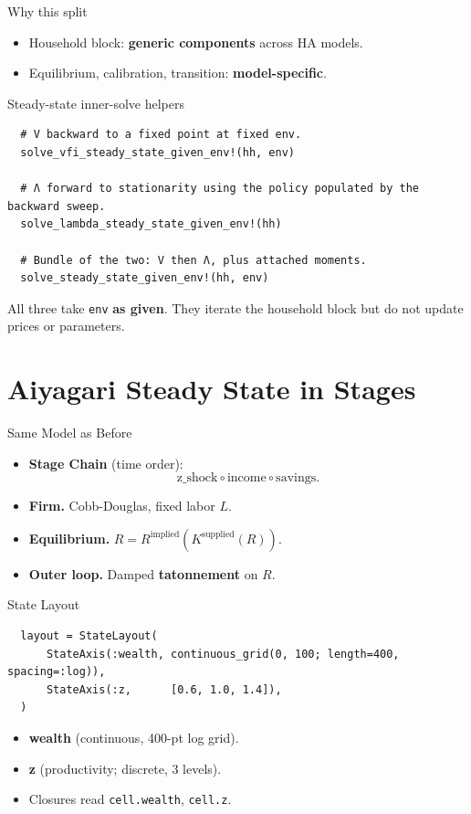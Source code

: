 \documentclass[10pt,aspectratio=169]{beamer}
\begin{document}
\begin{frame}{Why this split}
  \begin{itemize}
    \item Household block: \textbf{generic components} across HA models.
    \item Equilibrium, calibration, transition: \textbf{model-specific}.
  \end{itemize}
\end{frame}

\begin{frame}[fragile]{Steady-state inner-solve helpers}
  \begin{lstlisting}
  # V backward to a fixed point at fixed env.
  solve_vfi_steady_state_given_env!(hh, env)

  # Λ forward to stationarity using the policy populated by the backward sweep.
  solve_lambda_steady_state_given_env!(hh)

  # Bundle of the two: V then Λ, plus attached moments.
  solve_steady_state_given_env!(hh, env)
  \end{lstlisting}
  All three take \texttt{env} \textbf{as given}. They iterate the household block but do not update prices or parameters.
\end{frame}

\section{Aiyagari Steady State in Stages}

\begin{frame}{Same Model as Before}
  \begin{itemize}
    \item \textbf{Stage Chain} (time order): \[ \text{z\_shock} \circ \text{income} \circ \text{savings}. \]
    \item \textbf{Firm.} Cobb-Douglas, fixed labor $L$.
    \item \textbf{Equilibrium.} $R = R^{\mathrm{implied}}(K^{\mathrm{supplied}}(R))$.
    \item \textbf{Outer loop.} Damped \textbf{tatonnement} on $R$.
  \end{itemize}
\end{frame}

\begin{frame}[fragile]{State Layout}
  \begin{lstlisting}
  layout = StateLayout(
      StateAxis(:wealth, continuous_grid(0, 100; length=400, spacing=:log)),
      StateAxis(:z,      [0.6, 1.0, 1.4]),
  )
  \end{lstlisting}
  \begin{itemize}
    \item \textbf{wealth} (continuous, 400-pt log grid).
    \item \textbf{z} (productivity; discrete, 3 levels).
    \item Closures read \texttt{cell.wealth}, \texttt{cell.z}.
  \end{itemize}
\end{frame}
\end{document}
